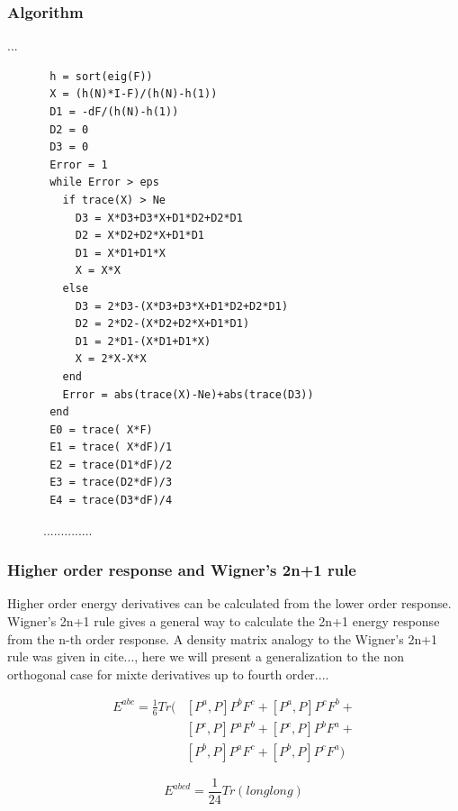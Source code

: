 \documentclass[twocolumn,showpacs,preprintnumbers,amsmath,amssymb]{revtex4}
\begin{document}
\subsubsection{Algorithm}
...\\
\begin{figure}[htbp]
  \centering
  \caption{\protect
    ..............
  }\label{fig:algo}
\begin{verbatim}
 h = sort(eig(F))
 X = (h(N)*I-F)/(h(N)-h(1))
 D1 = -dF/(h(N)-h(1))
 D2 = 0
 D3 = 0
 Error = 1
 while Error > eps
   if trace(X) > Ne
     D3 = X*D3+D3*X+D1*D2+D2*D1
     D2 = X*D2+D2*X+D1*D1
     D1 = X*D1+D1*X
     X = X*X
   else
     D3 = 2*D3-(X*D3+D3*X+D1*D2+D2*D1)
     D2 = 2*D2-(X*D2+D2*X+D1*D1)
     D1 = 2*D1-(X*D1+D1*X)
     X = 2*X-X*X
   end
   Error = abs(trace(X)-Ne)+abs(trace(D3))
 end
 E0 = trace( X*F)
 E1 = trace( X*dF)/1
 E2 = trace(D1*dF)/2
 E3 = trace(D2*dF)/3
 E4 = trace(D3*dF)/4
\end{verbatim}
\end{figure}


\subsubsection{Higher order response and Wigner's 2n+1 rule }
Higher order energy derivatives can be calculated from the lower
order response. Wigner's 2n+1 rule gives a general way to calculate the 2n+1
energy response from the n-th order response. A density matrix analogy to
the Wigner's 2n+1 rule was given in cite{...}, here we will present
a generalization to the non orthogonal case for mixte derivatives 
up to fourth order....



\begin{equation}
\begin{split}
  E^{abc}=\frac{1}{6}Tr(&[P^a,P]P^bF^c+[P^a,P]P^cF^b+\\
                        &[P^c,P]P^aF^b+[P^c,P]P^bF^a+\\
                        &[P^b,P]P^aF^c+[P^b,P]P^cF^a)
\end{split}
\end{equation}



\begin{equation}
E^{abcd}=\frac{1}{24}Tr(longlong)
\end{equation}



\end{document}
